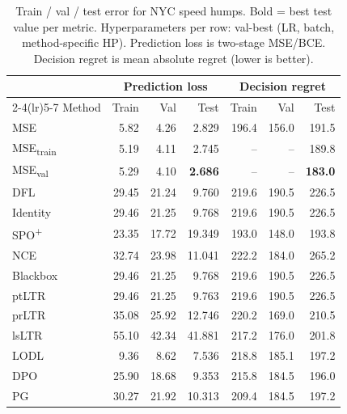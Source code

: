 \begin{table}[t]
\centering
\caption{Train / val / test error for NYC speed humps. Bold = best test value per metric. Hyperparameters per row: val-best (LR, batch, method-specific HP). Prediction loss is two-stage MSE/BCE. Decision regret is mean absolute regret (lower is better).}
\label{tab:err-speed-humps}
\setlength{\tabcolsep}{4pt}
\renewcommand{\arraystretch}{1.05}
\begin{tabular}{@{}lrrrrrr@{}}
\toprule
& \multicolumn{3}{c}{Prediction loss} & \multicolumn{3}{c}{Decision regret} \\
\cmidrule(lr){2-4}\cmidrule(lr){5-7}
Method & Train & Val & Test & Train & Val & Test \\
\midrule
MSE & 5.82 & 4.26 & 2.829 & 196.4 & 156.0 & 191.5 \\
MSE\textsubscript{train} & 5.19 & 4.11 & 2.745 & -- & -- & 189.8 \\
MSE\textsubscript{val} & 5.29 & 4.10 & \textbf{2.686} & -- & -- & \textbf{183.0} \\
DFL & 29.45 & 21.24 & 9.760 & 219.6 & 190.5 & 226.5 \\
Identity & 29.46 & 21.25 & 9.768 & 219.6 & 190.5 & 226.5 \\
SPO\textsuperscript{+} & 23.35 & 17.72 & 19.349 & 193.0 & 148.0 & 193.8 \\
NCE & 32.74 & 23.98 & 11.041 & 222.2 & 184.0 & 265.2 \\
Blackbox & 29.46 & 21.25 & 9.768 & 219.6 & 190.5 & 226.5 \\
ptLTR & 29.46 & 21.25 & 9.763 & 219.6 & 190.5 & 226.5 \\
prLTR & 35.08 & 25.92 & 12.746 & 220.2 & 169.0 & 210.5 \\
lsLTR & 55.10 & 42.34 & 41.881 & 217.2 & 176.0 & 201.8 \\
LODL & 9.36 & 8.62 & 7.536 & 218.8 & 185.1 & 197.2 \\
DPO & 25.90 & 18.68 & 9.353 & 215.8 & 184.5 & 196.0 \\
PG & 30.27 & 21.92 & 10.313 & 209.4 & 184.5 & 197.2 \\
\bottomrule
\end{tabular}
\end{table}

